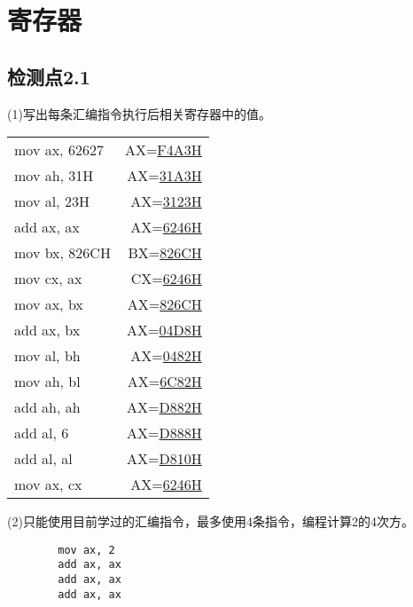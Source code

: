 \documentclass{elegantnote}
\begin{document}
    \section{寄存器}
    \subsection*{检测点2.1}
    (1)写出每条汇编指令执行后相关寄存器中的值。\par
    \begin{tabular}{lr}
        mov ax, 62627   &   AX=\underline{F4A3H} \\
        mov ah, 31H     &   AX=\underline{31A3H} \\
        mov al, 23H     &   AX=\underline{3123H} \\
        add ax, ax      &   AX=\underline{6246H} \\
        mov bx, 826CH   &   BX=\underline{826CH} \\
        mov cx, ax      &   CX=\underline{6246H} \\
        mov ax, bx      &   AX=\underline{826CH} \\
        add ax, bx      &   AX=\underline{04D8H} \\
        mov al, bh      &   AX=\underline{0482H} \\
        mov ah, bl      &   AX=\underline{6C82H} \\
        add ah, ah      &   AX=\underline{D882H} \\
        add al, 6       &   AX=\underline{D888H} \\
        add al, al      &   AX=\underline{D810H} \\
        mov ax, cx      &   AX=\underline{6246H} \\
    \end{tabular}\par
    (2)只能使用目前学过的汇编指令，最多使用4条指令，编程计算2的4次方。
    \begin{verbatim}
        mov ax, 2
        add ax, ax
        add ax, ax
        add ax, ax
    \end{verbatim}
\end{document}
